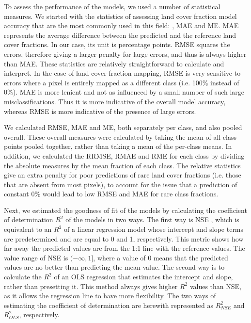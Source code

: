 \documentclass[review,authoryear,3p]{elsarticle}
\begin{document}
To assess the performance of the models, we used a number of statistical measures.
We started with the statistics of assessing land cover fraction model accuracy that are the most commonly used in this field: , \gls{MAE} and \gls{ME}.
\gls{MAE} represents the average difference between the predicted and the reference land cover fractions.
In our case, its unit is percentage points.
\gls{RMSE} squares the errors, therefore giving a larger penalty for large errors, and thus is always higher than \gls{MAE}.
These statistics are relatively straightforward to calculate and interpret.
In the case of land cover fraction mapping, \gls{RMSE} is very sensitive to errors where a pixel is entirely mapped as a different class (i.e. 100\% instead of 0\%).
\gls{MAE} is more lenient and not as influenced by a small number of such large misclassifications.
Thus it is more indicative of the overall model accuracy, whereas \gls{RMSE} is more indicative of the presence of large errors.

We calculated \gls{RMSE}, \ac{MAE} and \ac{ME}, both separately per class, and also pooled overall.
These overall measures were calculated by taking the mean of all class points pooled together, rather than taking a mean of the per-class means.
In addition, we calculated the \gls{RRMSE}, \gls{RMAE} and \gls{RME} for each class by dividing the absolute measures by the mean fraction of each class.
The relative statistics give an extra penalty for poor predictions of rare land cover fractions (i.e. those that are absent from most pixels), to account for the issue that a prediction of constant 0\% would lead to low \gls{RMSE} and \gls{MAE} for rare class fractions.

Next, we estimated the goodness of fit of the models by calculating the coefficient of determination $R^2$ of the models in two ways.
The first way is \gls{NSE} \citep{nash1970river}, which is equivalent to an $R^2$ of a linear regression model whose intercept and slope terms are predetermined and are equal to 0 and 1, respectively.
This metric shows how far away the predicted values are from the 1:1 line with the reference values.
The value range of \gls{NSE} is $(-\infty, 1]$, where a value of 0 means that the predicted values are no better than predicting the mean value.
The second way is to calculate the $R^2$ of an \gls{OLS} regression that estimates the intercept and slope, rather than presetting it.
This method always gives higher $R^2$ values than \gls{NSE}, as it allows the regression line to have more flexibility.
The two ways of estimating the coefficient of determination are herewith represented as $R^2_{NSE}$ and $R^2_{OLS}$, respectively.
\end{document}
